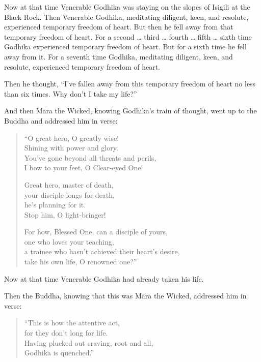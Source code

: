 \documentclass[12pt,openany]{book}%
\begin{document}
Now at that time Venerable Godhika was staying on the slopes of Isigili at the Black Rock. Then Venerable Godhika, meditating diligent, keen, and resolute, experienced temporary freedom of heart. But then he fell away from that temporary freedom of heart. For a second … third … fourth … fifth … sixth time Godhika experienced temporary freedom of heart. But for a sixth time he fell away from it. For a seventh time Godhika, meditating diligent, keen, and resolute, experienced temporary freedom of heart. 

Then he thought, “I’ve fallen away from this temporary freedom of heart no less than six times. Why don’t I take my life?” 

And then \textsanskrit{Māra} the Wicked, knowing Godhika’s train of thought, went up to the Buddha and addressed him in verse: 

\begin{verse}%
“O great hero, O greatly wise! \\
Shining with power and glory. \\
You’ve gone beyond all threats and perils, \\
I bow to your feet, O Clear-eyed One! 

Great hero, master of death, \\
your disciple longs for death, \\
he’s planning for it. \\
Stop him, O light-bringer! 

For how, Blessed One, can a disciple of yours, \\
one who loves your teaching, \\
a trainee who hasn’t achieved their heart’s desire, \\
take his own life, O renowned one?” 

%
\end{verse}

Now at that time Venerable Godhika had already taken his life. 

Then the Buddha, knowing that this was \textsanskrit{Māra} the Wicked, addressed him in verse: 

\begin{verse}%
“This is how the attentive act, \\
for they don’t long for life. \\
Having plucked out craving, root and all, \\
Godhika is quenched.” 

%
\end{verse}
\end{document}
